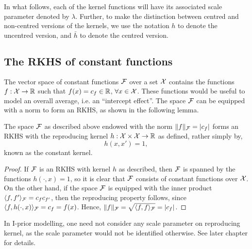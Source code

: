 In what follows, each of the kernel functions will have its associated scale parameter denoted by $\lambda$.
Further, to make the distinction between centred and non-centred versions of the kernels, we use the notation $h$ to denote the uncentred version, and $\bar h$ to denote the centred version.

\subsection{The RKHS of constant functions}

The vector space of constant functions ${\mathcal F}$ over a set ${\mathcal X}$ contains the functions $f:{\mathcal X} \to \mathbb{R}$ such that $f(x) = c_f \in \mathbb{R}$, $\forall x \in {\mathcal X}$.
These functions would be useful to model an overall average, i.e. an ``intercept effect''.
The space ${\mathcal F}$ can be equipped with a norm to form an RKHS, as shown in the following lemma.

\begin{proposition}[RKHS of constant functions]
  The space ${\mathcal F}$ as described above endowed with the norm $\lVert f\rVert_{\mathcal F} = \vert c_f \vert$ forms an RKHS with the reproducing kernel $h:{\mathcal X}\times{\mathcal X}\to\mathbb{R}$ as defined, rather simply by,
  \[
    h(x,x') = 1,
  \]
  known as the constant kernel.
\end{proposition}

\begin{proof}
  If ${\mathcal F}$ is an RKHS with kernel $h$ as described, then ${\mathcal F}$ is spanned by the  functions $h(\cdot,x) = 1$, so it is clear that ${\mathcal F}$ consists of constant functions over ${\mathcal X}$.
  On the other hand, if the space ${\mathcal F}$ is equipped with the inner product $\langle f,f'\rangle_{\mathcal F} = c_f c_{f'}$, then the reproducing property follows, since $\langle f,h(\cdot,x)\rangle_{\mathcal F} = c_f = f(x)$.
  Hence, $\lVert f\rVert_{\mathcal F} = \sqrt{\langle f,f\rangle_{\mathcal F}} = \vert c_f \vert$.
\end{proof}

In I-prior modelling, one need not consider any scale parameter on reproducing kernel, as the scale parameter would not be identified otherwise.
See later chapter for details.

